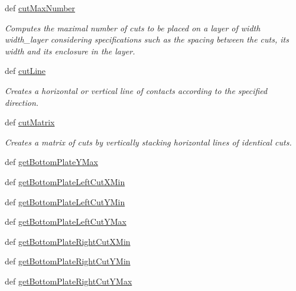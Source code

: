 \begin{DoxyCompactItemize}
def \hyperlink{classpython_1_1CapacitorUnit_1_1CapacitorUnit_a5c03a894501e69f2e6a6d40e93df8ef2}{cut\-Max\-Number}
\begin{DoxyCompactList}\small\item\em Computes the maximal number of cuts to be placed on a layer of width {\ttfamily width\-\_\-layer} considering specifications such as the spacing between the cuts, its width and its enclosure in the layer. \end{DoxyCompactList}\item 
def \hyperlink{classpython_1_1CapacitorUnit_1_1CapacitorUnit_a95ebae95cc0be711de5adbb1faa85f98}{cut\-Line}
\begin{DoxyCompactList}\small\item\em Creates a horizontal or vertical line of contacts according to the specified direction. \end{DoxyCompactList}\item 
def \hyperlink{classpython_1_1CapacitorUnit_1_1CapacitorUnit_a4b8fe45cf122a2682cd8120bcbc5e5fd}{cut\-Matrix}
\begin{DoxyCompactList}\small\item\em Creates a matrix of cuts by vertically stacking horizontal lines of identical cuts. \end{DoxyCompactList}\item 
def \hyperlink{classpython_1_1CapacitorUnit_1_1CapacitorUnit_a876d31edaaabe0716d6fbe6f6c0c7b75}{get\-Bottom\-Plate\-Y\-Max}
\item 
def \hyperlink{classpython_1_1CapacitorUnit_1_1CapacitorUnit_ae461baa28fdfa09bad07b3f1073a46b7}{get\-Bottom\-Plate\-Left\-Cut\-X\-Min}
\item 
def \hyperlink{classpython_1_1CapacitorUnit_1_1CapacitorUnit_aae1849792395fccc12e921450a29980b}{get\-Bottom\-Plate\-Left\-Cut\-Y\-Min}
\item 
def \hyperlink{classpython_1_1CapacitorUnit_1_1CapacitorUnit_a2f7b75e47a238defa63e04c75e0be016}{get\-Bottom\-Plate\-Left\-Cut\-Y\-Max}
\item 
def \hyperlink{classpython_1_1CapacitorUnit_1_1CapacitorUnit_a9e59fed4e9829bac60edbd38195cdd90}{get\-Bottom\-Plate\-Right\-Cut\-X\-Min}
\item 
def \hyperlink{classpython_1_1CapacitorUnit_1_1CapacitorUnit_a0e362c0f80ab5a70fa3e4139d0009ef1}{get\-Bottom\-Plate\-Right\-Cut\-Y\-Min}
\item 
def \hyperlink{classpython_1_1CapacitorUnit_1_1CapacitorUnit_ae31425a5f9b3d7a0829c1abc454e2834}{get\-Bottom\-Plate\-Right\-Cut\-Y\-Max}

\end{DoxyCompactItemize}
